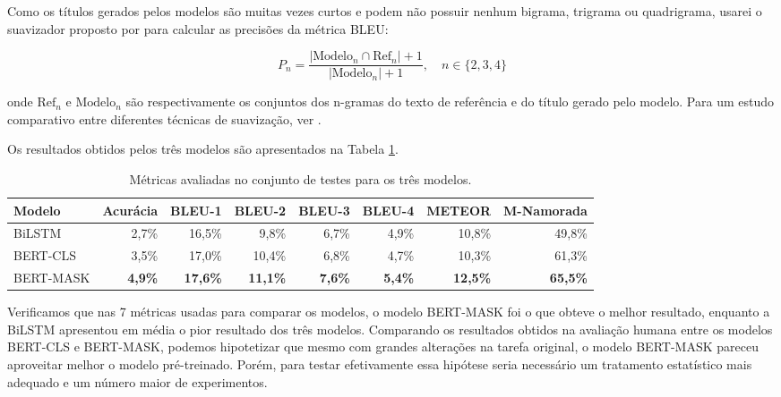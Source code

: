 \documentclass{article}
\begin{document}
Como os títulos gerados pelos modelos são muitas vezes curtos e podem não possuir nenhum bigrama, trigrama ou quadrigrama, usarei o suavizador proposto por \textcite{lin2004automatic} para calcular as precisões da métrica BLEU:

\begin{equation}
P_n = \frac{|\text{Modelo}_n \cap \text{Ref}_n| + 1}{|\text{Modelo}_n| + 1}, \quad n \in \{2, 3, 4\}
\end{equation}

\noindent onde $\text{Ref}_n$ e $\text{Modelo}_n$ são respectivamente os conjuntos dos n-gramas do texto de referência e do título gerado pelo modelo. Para um estudo comparativo entre diferentes técnicas de suavização, ver \textcite{chen2014systematic}.


Os resultados obtidos pelos três modelos são apresentados na Tabela \ref{table:results}.

\pagebreak

\begin{table}[h!]
	\centering
	\begin{tabular}{@{}lrrrrrrr@{}}
		\toprule
		Modelo &
		\multicolumn{1}{l}{Acurácia} &
		\multicolumn{1}{l}{BLEU-1} &
		\multicolumn{1}{l}{BLEU-2} &
		\multicolumn{1}{l}{BLEU-3} &
		\multicolumn{1}{l}{BLEU-4} &
		\multicolumn{1}{l}{METEOR} &
		\multicolumn{1}{l}{M-Namorada} \\ \midrule
		BiLSTM    & 2,7\%          & 16,5\%          & 9,8\%           & 6,7\%          & 4,9\%          & 10,8\%          & 49,8\%          \\
		BERT-CLS  & 3,5\%          & 17,0\%          & 10,4\%          & 6,8\%          & 4,7\%          & 10,3\%          & 61,3\%          \\
		BERT-MASK & \textbf{4,9\%} & \textbf{17,6\%} & \textbf{11,1\%} & \textbf{7,6\%} & \textbf{5,4\%} & \textbf{12,5\%} & \textbf{65,5\%} \\ \bottomrule
	\end{tabular}
	\caption{Métricas avaliadas no conjunto de testes para os três modelos.}
	\label{table:results}
\end{table}

Verificamos que nas 7 métricas usadas para comparar os modelos, o modelo BERT-MASK foi o que obteve o melhor resultado, enquanto a BiLSTM apresentou em média o pior resultado dos três modelos. Comparando os resultados obtidos na avaliação humana entre os modelos BERT-CLS e BERT-MASK, podemos hipotetizar que mesmo com grandes alterações na tarefa original, o modelo BERT-MASK pareceu aproveitar melhor o modelo pré-treinado. Porém, para testar efetivamente essa hipótese seria necessário um tratamento estatístico mais adequado e um número maior de experimentos.
\end{document}
